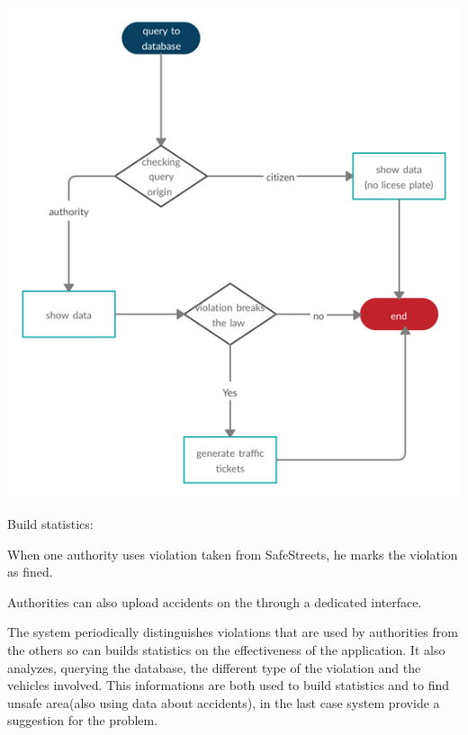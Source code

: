 \documentclass[../RASD.tex]{subfiles}
\begin{document}
    \begin{center}
        \includegraphics{assets/queryDb.png}\\
    \end{center}

    Build statistics:

    When one authority uses violation taken from SafeStreets, he marks the violation as fined.

    Authorities can also upload accidents on the through a dedicated interface.

    The system periodically distinguishes violations that are used by authorities from the others so can builds statistics on the effectiveness of the application. It also analyzes, querying the database, the different type of the violation and the vehicles involved. This informations are both used to build statistics and to find unsafe area(also using data about accidents), in the last case system provide a suggestion for the problem.
\end{document}
